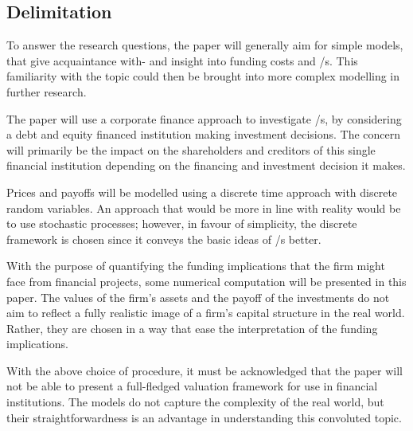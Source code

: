 \documentclass[main.tex]{subfiles}
\begin{document}
    \subsection{Delimitation}

    To answer the research questions, the paper will generally aim for simple models,
    that give acquaintance with- and insight into funding costs and \FVA/s.
    This familiarity with the topic could then be brought into more complex modelling
    in further research.

    The paper will use a corporate finance approach to investigate \FVA/s,
    by considering a debt and equity financed institution making investment decisions.
    The concern will primarily be the impact on the shareholders and creditors 
    of this single financial institution depending on the financing and investment decision it makes.

    Prices and payoffs will be modelled using a discrete time approach 
    with discrete random variables.
    An approach that would be more in line with reality would be to use stochastic processes;
    however, in favour of simplicity, the discrete framework is chosen 
    since it conveys the basic ideas of \FVA/s better.

    With the purpose of quantifying the funding implications that the firm might face from financial projects,
    some numerical computation will be presented in this paper.
    The values of the firm's assets and the payoff of the investments
    do not aim to reflect a fully realistic image of a firm's capital structure in the real world.
    Rather, they are chosen in a way that ease the interpretation of the funding implications.

    With the above choice of procedure, it must be acknowledged that the paper will not be able to
    present a full-fledged valuation framework for use in financial institutions.
    The models do not capture the complexity of the real world,
    but their straightforwardness is an advantage in understanding this convoluted topic.
\end{document}
